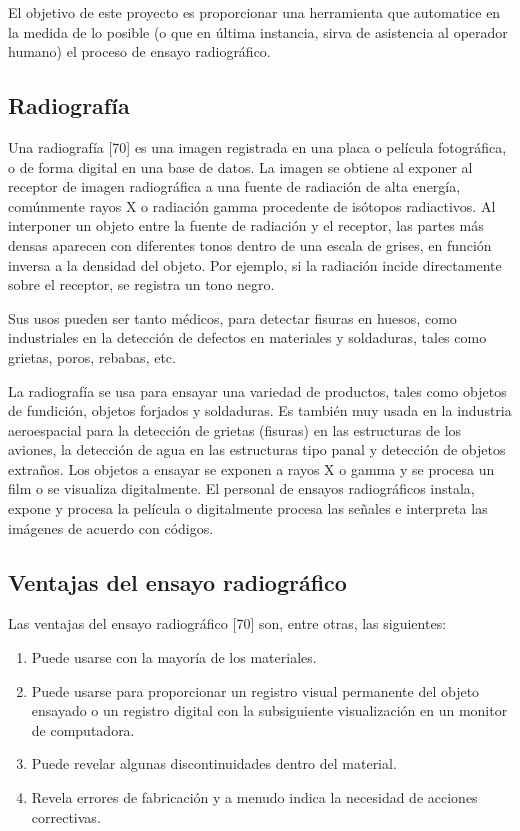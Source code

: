 El objetivo de este proyecto es proporcionar una herramienta que automatice en la medida de lo posible (o que en última instancia, sirva de asistencia al operador humano) el proceso de ensayo radiográfico.

\subsection{Radiografía}
Una radiografía [70] es una imagen registrada en una placa o película fotográfica, o de forma digital en una base de datos. La imagen se obtiene al exponer al receptor de imagen radiográfica a una fuente de radiación de alta energía, comúnmente rayos X o radiación gamma procedente de isótopos radiactivos. Al interponer un objeto entre la fuente de radiación y el receptor, las partes más densas aparecen con diferentes tonos dentro de una escala de grises, en función inversa a la densidad del objeto. Por ejemplo, si la radiación incide directamente sobre el receptor, se registra un tono negro.

Sus usos pueden ser tanto médicos, para detectar fisuras en huesos, como industriales en la detección de defectos en materiales y soldaduras, tales como grietas, poros, rebabas, etc.

La radiografía se usa para ensayar una variedad de productos, tales como objetos de fundición, objetos forjados y soldaduras. Es también muy usada en la industria aeroespacial para la detección de grietas (fisuras) en las estructuras de los aviones, la detección de agua en las estructuras tipo panal y detección de objetos extraños. Los objetos a ensayar se exponen a rayos X o gamma y se procesa un film o se visualiza digitalmente. El personal de ensayos radiográficos instala, expone y procesa la película o digitalmente procesa las señales e interpreta las imágenes de acuerdo con códigos.

\subsection{Ventajas del ensayo radiográfico}
Las ventajas del ensayo radiográfico [70] son, entre otras, las siguientes:

\begin{enumerate}
\item Puede usarse con la mayoría de los materiales.
\item Puede usarse para proporcionar un registro visual permanente del objeto ensayado o un registro digital con la subsiguiente visualización en un monitor de computadora.
\item Puede revelar algunas discontinuidades dentro del material.
\item Revela errores de fabricación y a menudo indica la necesidad de acciones correctivas.
\end{enumerate}

